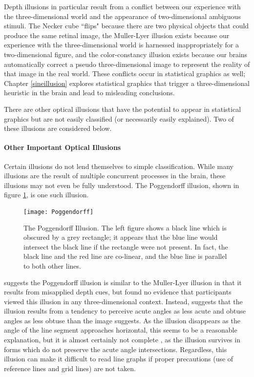 \documentclass[11pt]{isuthesis}\usepackage[]{graphicx}\usepackage[]{color}
\begin{document}
Depth illusions in particular result from a conflict between our experience with the three-dimensional world and the appearance of two-dimensional ambiguous stimuli. The Necker cube ``flips" because there are two physical objects that could produce the same retinal image, the Muller-Lyer illusion exists because our experience with the three-dimensional world is harnessed inappropriately for a two-dimensional figure, and the color-constancy illusion exists because our brains automatically correct a pseudo three-dimensional image to represent the reality of that image in the real world. These conflicts occur in statistical graphics as well; Chapter \ref{sineillusion} explores statistical graphics that trigger a three-dimensional heuristic in the brain and lead to misleading conclusions.

There are other optical illusions that have the potential to appear in statistical graphics but are not easily classified (or necessarily easily explained). Two of these illusions are considered below.
\paragraph{Other Important Optical Illusions}
Certain illusions do not lend themselves to simple classification. While many illusions are the result of multiple concurrent processes in the brain, these illusions may not even be fully understood. The Poggendorff illusion, shown in figure \ref{fig:poggendorff}, is one such illusion. 

\begin{figure}[htbp]\centering
\texttt{[image: Poggendorff]}
\caption[The Poggendorff Illusion]{The Poggendorff Illusion. The left figure shows a black line which is obscured by a grey rectangle; it appears that the blue line would intersect the black line if the rectangle were not present. In fact, the black line and the red line are co-linear, and the blue line is parallel to both other lines.}\label{fig:poggendorff}
\end{figure}

\citet{gregory1963distortion, gregory1997knowledge} suggests the Poggendorff illusion is similar to the Muller-Lyer illusion in that it results from misapplied depth cues, but \citet{green1963poggendorff, ward1977case} found no evidence that participants viewed this illusion in any three-dimensional context. Instead, \citet{green1963poggendorff} suggests that the illusion results from a tendency to perceive acute angles as less acute and obtuse angles as less obtuse than the image suggests. As the illusion disappears as the angle of the line segment approaches horizontal, this seems to be a reasonable explanation, but it is almost certainly not complete \citep{morgan1999poggendorff}, as the illusion survives in forms which do not preserve the acute angle intersections. Regardless, this illusion can make it difficult to read line graphs \citep{amer2005bias, poulton1985geometric} if proper precautions (use of reference lines and grid lines) are not taken.
\end{document}
